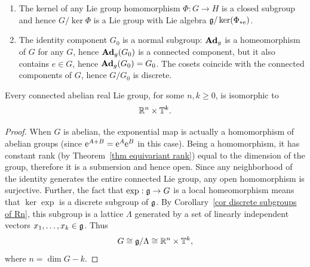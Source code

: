 \begin{example}\label{example kernel subgroup}
    \begin{enumerate}
        \item The kernel of any Lie group homomorphism $\Phi:G\to H$ is a closed subgroup and hence $G\slash \ker\Phi$ is a Lie group with Lie algebra $\mathfrak{g}\slash\ker(\Phi_{\ast e})$.
        \item The identity component $G_0$ is a normal subgroup: $\mathrm{\mathbf{Ad}}_g$ is a homeomorphism of $G$ for any $G$, hence $\mathrm{\mathbf{Ad}}_g(G_0)$ is a connected component, but it also contains $e\in G$, hence $\mathrm{\mathbf{Ad}}_g(G_0)=G_0$. The cosets coincide with the connected components of $G$, hence $G\slash G_0$ is discrete.
    \end{enumerate}
\end{example}



\begin{cor}
    Every connected abelian real Lie group,  for some $n,k\geq 0$, is isomorphic to
    \[\mathbb{R}^n\times \mathbb{T}^k.\]
\end{cor}
\begin{proof}
    When $G$ is abelian, the exponential map is actually a homomorphism of abelian groups (since $\mathrm{e}^{A+B}=\mathrm{e}^A\mathrm{e}^B$ in this case). Being a homomorphism, it has constant rank (by Theorem~\ref{thm equivariant rank}) equal to the dimension of the group, therefore it is a submersion and hence open. Since any neighborhood of the identity generates the entire connected Lie group, any open homomorphism is surjective. Further, the fact that $\exp:\mathfrak{g}\to G$ is a local homeomorphism means that $\ker\exp $ is a discrete subgroup of $\mathfrak{g}$. By Corollary~\ref{cor discrete subgroups of Rn}, this subgroup is a lattice $\Lambda$ generated by a set of linearly independent vectors $x_1,\ldots,x_k\in\mathfrak{g}$. Thus
    \[G\cong \mathfrak{g}\slash \Lambda\cong \mathbb{R}^n\times \mathbb{T}^k,\]
    where $n=\dim G-k$.
\end{proof}


